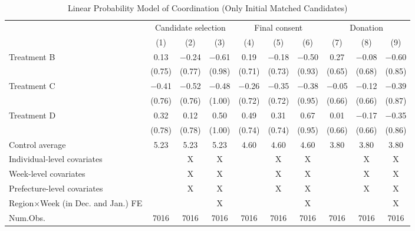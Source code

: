 \documentclass[12pt, a4paper]{article}
\begin{document}
\begin{table}[H]

\caption{\label{tab:lm-coordinate-initial-matched}Linear Probability Model of Coordination (Only Initial Matched Candidates)}
\centering
\fontsize{8}{10}\selectfont
\begin{threeparttable}
\begin{tabular}[t]{lccccccccc}
\toprule
\multicolumn{1}{c}{ } & \multicolumn{3}{c}{Candidate selection} & \multicolumn{3}{c}{Final consent} & \multicolumn{3}{c}{Donation} \\
\cmidrule(l{3pt}r{3pt}){2-4} \cmidrule(l{3pt}r{3pt}){5-7} \cmidrule(l{3pt}r{3pt}){8-10}
  & (1) & (2) & (3) & (4) & (5) & (6) & (7) & (8) & (9)\\
\midrule
Treatment B & \num{0.13} & \num{-0.24} & \num{-0.61} & \num{0.19} & \num{-0.18} & \num{-0.50} & \num{0.27} & \num{-0.08} & \num{-0.60}\\
 & (\num{0.75}) & (\num{0.77}) & (\num{0.98}) & (\num{0.71}) & (\num{0.73}) & (\num{0.93}) & (\num{0.65}) & (\num{0.68}) & (\num{0.85})\\
Treatment C & \num{-0.41} & \num{-0.52} & \num{-0.48} & \num{-0.26} & \num{-0.35} & \num{-0.38} & \num{-0.05} & \num{-0.12} & \num{-0.39}\\
 & (\num{0.76}) & (\num{0.76}) & (\num{1.00}) & (\num{0.72}) & (\num{0.72}) & (\num{0.95}) & (\num{0.66}) & (\num{0.66}) & (\num{0.87})\\
Treatment D & \num{0.32} & \num{0.12} & \num{0.50} & \num{0.49} & \num{0.31} & \num{0.67} & \num{0.01} & \num{-0.17} & \num{-0.35}\\
 & (\num{0.78}) & (\num{0.78}) & (\num{1.00}) & (\num{0.74}) & (\num{0.74}) & (\num{0.95}) & (\num{0.66}) & (\num{0.66}) & (\num{0.86})\\
\midrule
Control average & 5.23 & 5.23 & 5.23 & 4.60 & 4.60 & 4.60 & 3.80 & 3.80 & 3.80\\
Individual-level covariates &  & X & X &  & X & X &  & X & X\\
Week-level covariates &  & X & X &  & X & X &  & X & X\\
Prefecture-level covariates &  & X & X &  & X & X &  & X & X\\
Region$\times$Week (in Dec. and Jan.) FE &  &  & X &  &  & X &  &  & X\\
Num.Obs. & \num{7016} & \num{7016} & \num{7016} & \num{7016} & \num{7016} & \num{7016} & \num{7016} & \num{7016} & \num{7016}\\
\bottomrule
\end{tabular}

\end{threeparttable}
\end{table}
\end{document}
